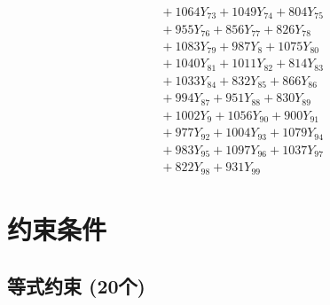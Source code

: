 \documentclass[a4paper,10pt]{article}
\begin{document}
{\begin{align}
&\quad  + 1064Y_{73} + 1049Y_{74} + 804Y_{75} \\[0.5ex]
&\quad  + 955Y_{76} + 856Y_{77} + 826Y_{78} \\[0.5ex]
&\quad  + 1083Y_{79} + 987Y_{8} + 1075Y_{80} \\[0.5ex]
&\quad  + 1040Y_{81} + 1011Y_{82} + 814Y_{83} \\[0.5ex]
&\quad  + 1033Y_{84} + 832Y_{85} + 866Y_{86} \\[0.5ex]
&\quad  + 994Y_{87} + 951Y_{88} + 830Y_{89} \\[0.5ex]
&\quad  + 1002Y_{9} + 1056Y_{90} + 900Y_{91} \\[0.5ex]
&\quad  + 977Y_{92} + 1004Y_{93} + 1079Y_{94} \\[0.5ex]
&\quad  + 983Y_{95} + 1097Y_{96} + 1037Y_{97} \\[0.5ex]
&\quad  + 822Y_{98} + 931Y_{99}\nonumber
\end{align}
}

\section{约束条件}

\subsection{等式约束 (20个)}
\end{document}
